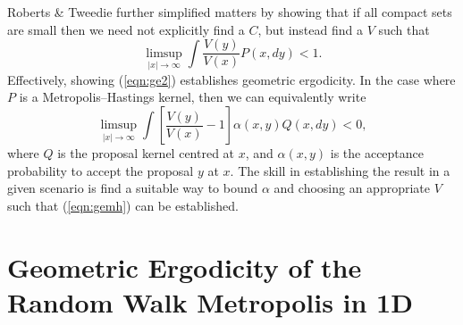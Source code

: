 \documentclass{article}
\begin{document}
Roberts \& Tweedie \cite{roberts1996geometric} further simplified matters by showing that if all compact sets are small then we need not explicitly find a $C$, but instead find a $V$ such that
\begin{equation} \label{eqn:ge2}
\limsup_{|x| \to \infty} \int \frac{V(y)}{V(x)} P(x,dy) < 1.
\end{equation}
Effectively, showing (\ref{eqn:ge2}) establishes geometric ergodicity.  In the case where $P$ is a Metropolis--Hastings kernel, then we can equivalently write
\begin{equation} \label{eqn:gemh}
\limsup_{|x| \to \infty} \int \left[ \frac{V(y)}{V(x)} - 1 \right] \alpha(x,y)Q(x,dy) < 0,
\end{equation}
where $Q$ is the proposal kernel centred at $x$, and $\alpha(x,y)$ is the acceptance probability to accept the proposal $y$ at $x$.  The skill in establishing the result in a given scenario is find a suitable way to bound $\alpha$ and choosing an appropriate $V$ such that (\ref{eqn:gemh}) can be established.

\section{Geometric Ergodicity of the Random Walk Metropolis in 1D}
\end{document}
